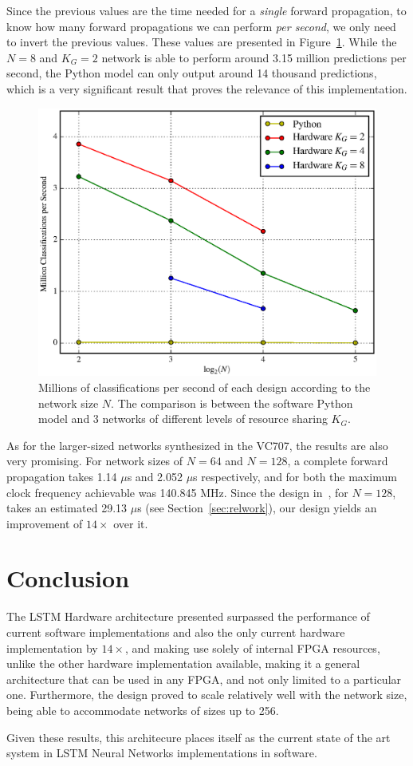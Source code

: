 \documentclass{IEEEtran}
\begin{document}
Since the previous values are the time needed for a \emph{single} forward propagation, to know how many forward propagations we can perform \emph{per second},
we only need to invert the previous values. These values are presented in Figure~\ref{fig:Mclass-psec}. While the $N=8$ and $K_G=2$ network is able to
perform around 3.15 million predictions per second, the Python model can only output around 14 thousand predictions, which is a very significant result that
proves the relevance of this implementation.

\begin{figure}
    \centering
    \includegraphics[width=\linewidth]{figures/Mclass-psec.eps}
    \caption[Millions of classifications per second of each design according to the network size $N$]{Millions of classifications per second of each design according to the network size $N$. The comparison is between the software Python model and 3 networks of different levels of resource sharing $K_G$.}
    \label{fig:Mclass-psec}
\end{figure}

As for the larger-sized networks synthesized in the VC707, the results are also very promising. For network sizes of $N=64$ and $N=128$, a complete
forward propagation takes 1.14 $\mu$s and 2.052 $\mu$s respectively, and for both the maximum clock frequency achievable was 140.845 MHz. Since the
design in~\cite{Chang15}, for $N=128$, takes an estimated 29.13 $\mu$s (see Section~\ref{sec:relwork}), our design yields an improvement of $14\times$
over it.

\section{Conclusion}\label{sec:concl}
The LSTM Hardware architecture presented surpassed the performance of current software implementations
and also the only current hardware implementation by $14\times$, and making use solely of internal FPGA
resources, unlike the other hardware implementation available, making it a general architecture that can
be used in any FPGA, and not only limited to a particular one. Furthermore, the design proved to scale relatively
well with the network size, being able to accommodate networks of sizes up to 256.

Given these results, this architecure places itself as the current state of the art system in LSTM Neural Networks
implementations in software.



\end{document}
